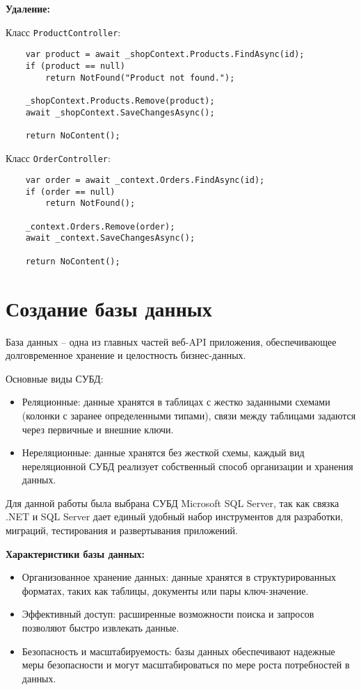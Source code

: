\documentclass[a4paper,12pt]{report}
\begin{document}
\textbf{Удаление:}

Класс \texttt{ProductController}:
\begin{verbatim}
    var product = await _shopContext.Products.FindAsync(id);
    if (product == null)
        return NotFound("Product not found.");

    _shopContext.Products.Remove(product);
    await _shopContext.SaveChangesAsync();

    return NoContent();
\end{verbatim}

Класс \texttt{OrderController}:
\begin{verbatim}
    var order = await _context.Orders.FindAsync(id);
    if (order == null)
        return NotFound();

    _context.Orders.Remove(order);
    await _context.SaveChangesAsync();

    return NoContent();
\end{verbatim}

\section{Создание базы данных}

База данных -- одна из главных частей веб-\acs{API} приложения, 
обеспечивающее долговременное хранение и целостность бизнес-данных.

Основные виды \acs{СУБД}:
\begin{itemize}
    \item
        Реляционные: данные хранятся в таблицах с жестко заданными схемами 
        (колонки с заранее определенными типами), связи между таблицами 
        задаются через первичные и внешние ключи.
    \item
        Нереляционные: данные хранятся без жесткой схемы, каждый вид 
        нереляционной \acs{СУБД} реализует собственный способ организации и хранения данных.
\end{itemize}

Для данной работы была выбрана \acs{СУБД} Microsoft SQL Server, 
так как связка .NET и SQL Server дает единый удобный набор 
инструментов для разработки, миграций, тестирования и развертывания приложений.

\textbf{Характеристики базы данных:}
\begin{itemize}
    \item
        Организованное хранение данных: данные хранятся в структурированных 
        форматах, таких как таблицы, документы или пары ключ-значение.
    \item
        Эффективный доступ: расширенные возможности поиска и запросов позволяют быстро извлекать данные.
    \item
        Безопасность и масштабируемость: базы данных обеспечивают надежные меры 
        безопасности и могут масштабироваться по мере роста потребностей в данных.\cite{database}
\end{itemize}
\end{document}
